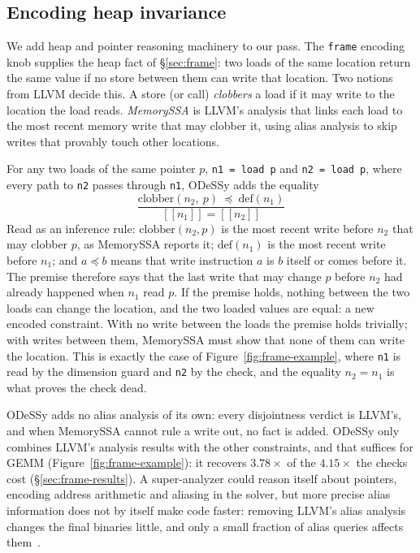 \documentclass[acmsmall,screen,nonacm]{acmart}
\newcommand{\odessy}{ODeSSy}
\newcommand{\tool}{\odessy}
\newcommand{\den}[1]{[\![#1]\!]}
\begin{document}
\subsection{Encoding heap invariance}
\label{sec:frame-machinery}
We add heap and pointer reasoning machinery to our pass. The \texttt{frame} encoding knob supplies the heap fact of \S\ref{sec:frame}:
two loads of the same location return the same value if no store
between them can write that location. Two notions from LLVM decide this.
A store (or call) \emph{clobbers} a load if it may write to the location
the load reads. \emph{MemorySSA} is LLVM's analysis that links each load
to the most recent memory write that may clobber it, using alias
analysis to skip writes that provably touch other locations.

For any two loads of the same pointer $p$, \texttt{n1 = load p} and
\texttt{n2 = load p}, where every path to \texttt{n2} passes through
\texttt{n1}, \tool{} adds the equality
\[
\frac{\mathrm{clobber}(n_2,\ p) \ \preceq\ \mathrm{def}(n_1)}
     {\den{n_1} = \den{n_2}}
\]
Read as an inference rule: $\mathrm{clobber}(n_2, p)$ is the most recent
write before $n_2$ that may clobber $p$, as MemorySSA reports it;
$\mathrm{def}(n_1)$ is the most recent write before $n_1$; and
$a \preceq b$ means that write instruction $a$ is $b$ itself or comes before it. The
premise therefore says that the last write that may change $p$ before
$n_2$ had already happened when $n_1$ read $p$. If the premise
holds, nothing between the two loads can change the location, and the
two loaded values are equal: a new encoded constraint. With no write
between the loads the premise holds trivially; with writes between them,
MemorySSA must show that none of them can write the location. This is exactly
the case of Figure~\ref{fig:frame-example}, where \texttt{n1} is read by
the dimension guard and \texttt{n2} by the check, and the equality
$n_2 = n_1$ is what proves the check dead.

\tool{} adds no alias analysis of
its own: every disjointness verdict is LLVM's, and when MemorySSA cannot
rule a write out, no fact is added. \tool{} only combines LLVM's analysis results with the other constraints, and that suffices for GEMM (Figure~\ref{fig:frame-example}): it recovers $3.78\times$ of the $4.15\times$ the checks cost (\S\ref{sec:frame-results}). A super-analyzer could reason itself about pointers, encoding address arithmetic and aliasing in the
solver, but more precise alias information does not by itself make code
faster: removing LLVM's alias analysis changes the final binaries little,
and only a small fraction of alias queries affects them~\cite{relaxingalias2025}.
\end{document}
